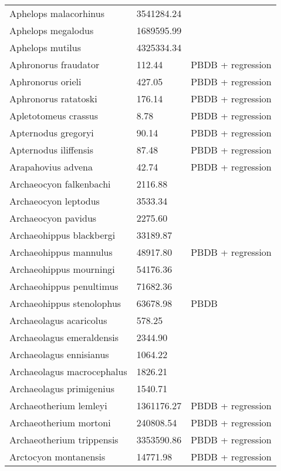\documentclass{article}
\begin{document}
\begin{center}
\begin{longtable}{p{} p{} p{} }
  Aphelops malacorhinus & 3541284.24 & \cite{Tomiya2013} \\ 
  Aphelops megalodus & 1689595.99 & \cite{Tomiya2013} \\ 
  Aphelops mutilus & 4325334.34 & \cite{Tomiya2013} \\ 
  Aphronorus fraudator & 112.44 & PBDB + regression \\ 
  Aphronorus orieli & 427.05 & PBDB + regression \\ 
  Aphronorus ratatoski & 176.14 & PBDB + regression \\ 
  Apletotomeus crassus & 8.78 & PBDB + regression \\ 
  Apternodus gregoryi & 90.14 & PBDB + regression \\ 
  Apternodus iliffensis & 87.48 & PBDB + regression \\ 
  Arapahovius advena & 42.74 & PBDB + regression \\ 
  Archaeocyon falkenbachi & 2116.88 & \cite{Stirton1932} \\ 
  Archaeocyon leptodus & 3533.34 & \cite{Tomiya2013} \\ 
  Archaeocyon pavidus & 2275.60 & \cite{Tomiya2013} \\ 
  Archaeohippus blackbergi & 33189.87 & \cite{Tomiya2013} \\ 
  Archaeohippus mannulus & 48917.80 & PBDB + regression \\ 
  Archaeohippus mourningi & 54176.36 & \cite{Tomiya2013} \\ 
  Archaeohippus penultimus & 71682.36 & \cite{Tomiya2013} \\ 
  Archaeohippus stenolophus & 63678.98 & PBDB \\ 
  Archaeolagus acaricolus & 578.25 & \cite{Tomiya2013} \\ 
  Archaeolagus emeraldensis & 2344.90 & \cite{Tomiya2013} \\ 
  Archaeolagus ennisianus & 1064.22 & \cite{Tomiya2013} \\ 
  Archaeolagus macrocephalus & 1826.21 & \cite{Tomiya2013} \\ 
  Archaeolagus primigenius & 1540.71 & \cite{Tomiya2013} \\ 
  Archaeotherium lemleyi & 1361176.27 & PBDB + regression \\ 
  Archaeotherium mortoni & 240808.54 & PBDB + regression \\ 
  Archaeotherium trippensis & 3353590.86 & PBDB + regression \\ 
  Arctocyon montanensis & 14771.98 & PBDB + regression \\ 

\end{longtable}
\end{center}
\end{document}
